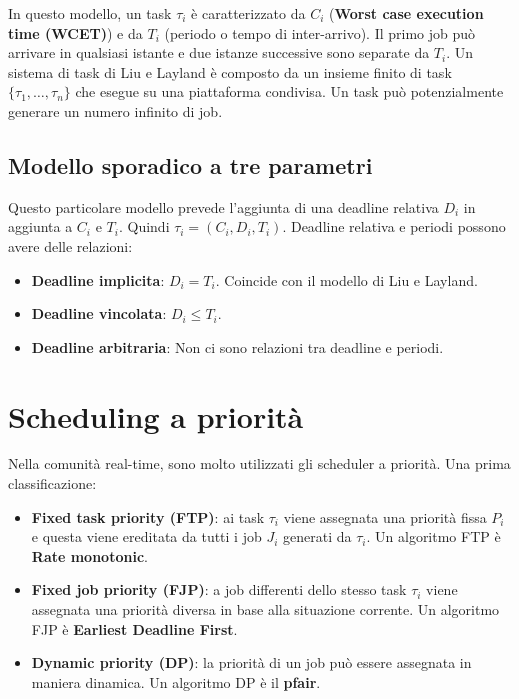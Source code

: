 \documentclass[11pt,a4paper]{report}
\begin{document}
In questo modello, un task $\tau_i$ è caratterizzato da $C_i$ (\textbf{Worst case execution time (WCET)}) e da $T_i$ (periodo o tempo di inter-arrivo). Il primo job può arrivare in qualsiasi istante e due istanze successive sono separate da $T_i$. Un sistema di task di Liu e Layland è composto da un insieme finito di task $\{\tau_1, \ldots, \tau_n\}$ che esegue su una piattaforma condivisa. Un task può potenzialmente generare un numero infinito di job.

\subsection{Modello sporadico a tre parametri}

Questo particolare modello prevede l'aggiunta di una deadline relativa $D_i$ in aggiunta a $C_i$ e $T_i$. Quindi $\tau_i = (C_i, D_i, T_i)$. Deadline relativa e periodi possono avere delle relazioni:
\begin{itemize}
    \item \textbf{Deadline implicita}: $D_i = T_i$. Coincide con il modello di Liu e Layland.
    \item \textbf{Deadline vincolata}: $D_i \le T_i$.
    \item \textbf{Deadline arbitraria}: Non ci sono relazioni tra deadline e periodi.
\end{itemize}

\section{Scheduling a priorità}

Nella comunità real-time, sono molto utilizzati gli scheduler a priorità. Una prima classificazione:
\begin{itemize}
    \item \textbf{Fixed task priority (FTP)}: ai task $\tau_i$ viene assegnata una priorità fissa $P_i$ e questa viene ereditata da tutti i job $J_i$ generati da $\tau_i$. Un algoritmo FTP è \textbf{Rate monotonic}.
    \item \textbf{Fixed job priority (FJP)}: a job differenti dello stesso task $\tau_i$ viene assegnata una priorità diversa in base alla situazione corrente. Un algoritmo FJP è \textbf{Earliest Deadline First}.
    \item \textbf{Dynamic priority (DP)}: la priorità di un job può essere assegnata in maniera dinamica. Un algoritmo DP è il \textbf{pfair}.
\end{itemize}
\end{document}
